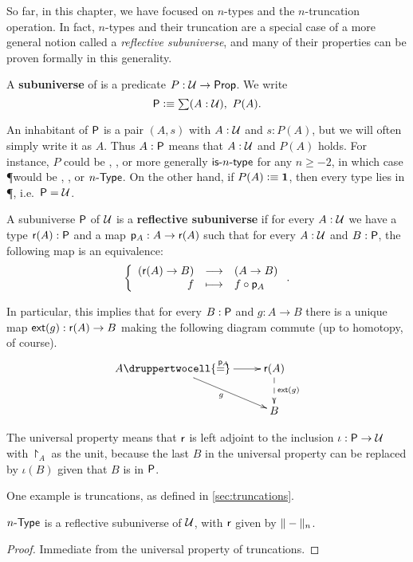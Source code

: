So far, in this chapter, we have focused on $n$-types and the $n$-truncation operation.
In fact, $n$-types and their truncation are a special case of a more general notion called a \emph{reflective subuniverse}, and many of their properties can be proven formally in this generality.

\begin{defn}
  A \textbf{subuniverse} of \type is a predicate $P:\type \to \prop$.
  We write
  \[\P \defeq \sm{A:\type} P(A).\]
\end{defn}

An inhabitant of $\P$ is a pair $(A,s)$ with $A:\type$ and $s:P(A)$, but we will often simply write it as $A$.
Thus $A:\P$ means that $A:\type$ and $P(A)$ holds.
For instance, $P$ could be \isprop, \isset, or more generally $\istype{n}$ for any $n\ge-2$, in which case \P would be \prop, \set, or $\typele{n}$.
On the other hand, if $P(A)\defeq \unit$, then every type lies in \P, i.e.\ $\P=\type$.

\begin{defn}
  A subuniverse $\P$ of $\type$ is a \textbf{reflective subuniverse} if
  for every $A:\type$ we have a type $\reflect(A):\P$ and a map
  $\project_A:A\to\reflect(A)$ such that for every $A:\type$ and $B:\P$, the following map is an equivalence:
  \[\function{(\reflect(A)\to{}B)}{(A\to{}B)}{f}{f\circ\project_A}.\]
\end{defn}

In particular, this implies that for every $B:\P$ and $g:A\to{}B$ there is a unique map $\ext(g):\reflect(A)\to{}B$ making the following diagram commute (up to homotopy, of course).
\[\uppercurveobject{{ }}\lowercurveobject{{ }}\twocellhead{{ }}
\xymatrix{A \ar^{\project_A}[r] \ar_g[rd] \druppertwocell{=} & \reflect(A)
  \ar@{-->}^{\ext(g)}[d] \\
  & B}\]

The universal property means that $\reflect$ is left adjoint to the inclusion
$\iota:\P\to\type$ with $\project_A$ as the unit, because the last $B$ in the
universal property can be replaced by $\iota(B)$ given that $B$ is in $\P$.

One example is truncations, as defined in \autoref{sec:truncations}.
\begin{lem}
  $\typele{n}$ is a reflective subuniverse of $\type$, with $\reflect$
  given by $\trunc{n}{-}$.
\end{lem}
\begin{proof}
Immediate from the universal property of truncations.  
\end{proof}

